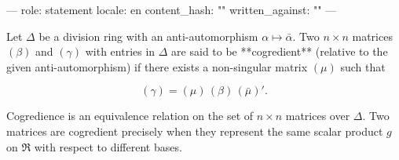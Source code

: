 ---
role: statement
locale: en
content_hash: ""
written_against: ""
---

Let $\Delta$ be a division ring with an anti-automorphism $\alpha \mapsto \bar{\alpha}$. Two $n \times n$ matrices $(\beta)$ and $(\gamma)$ with entries in $\Delta$ are said to be **cogredient** (relative to the given anti-automorphism) if there exists a non-singular matrix $(\mu)$ such that

$$(\gamma) = (\mu)\, (\beta)\, (\bar{\mu})'.$$

Cogredience is an equivalence relation on the set of $n \times n$ matrices over $\Delta$. Two matrices are cogredient precisely when they represent the same scalar product $g$ on $\mathfrak{R}$ with respect to different bases.
